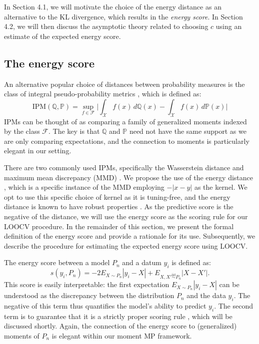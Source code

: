 \documentclass[11pt,a4paper]{article}
\newcommand{\iid}{\overset{\mathrm{iid}}{\sim}}
\theoremstyle{plain}
\theoremstyle{remark}
\theoremstyle{remark}
\begin{document}
In Section 4.1, we will motivate the choice of the {energy distance} \citep{rizzo2016} as an alternative to the KL divergence, which results in the \textit{energy score}.  In Section 4.2, we will then discuss the asymptotic theory related to choosing $c$ using an estimate of the expected energy score. 

\subsection{The energy score}

An alternative popular choice of distances between probability measures is the class of integral pseudo-probability metrics \cite{muller1997integral}, which is defined as: 
$$\text{IPM}(\mathbb{Q},\mathbb{P})=\sup_{f\in\mathcal{F}}\Big|\int_\mathcal{X}f(x)\,d\mathbb{Q}(x)-\int_\mathcal{X}f(x)\,d\mathbb{P}(x)\Big|$$
IPMs can be thought of as comparing a family of generalized moments indexed by the class $\mathcal{F}$. The key is that $\mathbb{Q}$ and $\mathbb{P}$ need not have the same support as we are only comparing expectations, and the connection to moments is particularly elegant in our setting.

There are two commonly used IPMs, specifically the Wasserstein distance \citep{vallender1974calculation} and maximum mean discrepancy (MMD) \citep{smola2006maximum}. We propose the use of the energy distance \citep{rizzo2016}, which is a specific instance of the MMD employing $-|x-y|$ as the kernel. We opt to use this specific choice of kernel as it is tuning-free, and the energy distance is known to have robust properties \citep{gneiting2007strictly,huk2024quasi}. As the predictive score is the negative of the distance, we will use the energy score as the scoring rule for our LOOCV procedure. In the remainder of this section, we present the formal definition of the energy score and provide a rationale for its use. Subsequently, we describe the procedure for estimating the expected energy score using LOOCV.

The energy score between a model $P_n$ and a datum $y_i$ is defined as: 
$$s(y_i,P_n)=  -2E_{X\sim P_n}|y_i-X| + E_{X,X'\iid P_n}|X-X'|.$$
This score is easily interpretable: the first expectation $E_{X\sim P_n}|y_i-X|$ can be understood as the discrepancy between the distribution $P_n$ and the data $y_i$. The negative of this term thus quantifies the model's ability to predict $y_i$. The second term is to guarantee that it is a strictly proper scoring rule \citep{gneiting2007strictly}, which will be discussed shortly. Again, the connection of the energy score to (generalized) moments of $P_n$ is elegant within our moment MP framework.
\end{document}
